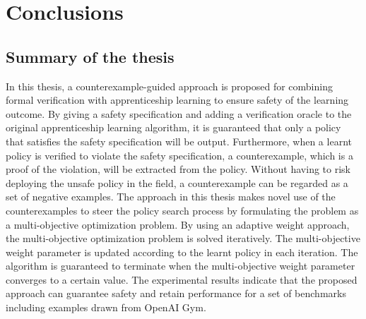 \chapter{Conclusions}
\label{chapter:Conclusions}
\thispagestyle{myheadings}

\graphicspath{{3_Conclusion/Figures/}}

\section{Summary of the thesis}
In this thesis, a counterexample-guided approach is proposed for combining formal verification with apprenticeship learning to ensure safety of the learning outcome. By giving a safety specification and adding a verification oracle to the original apprenticeship learning algorithm, it is guaranteed that only a policy that satisfies the safety specification will be output. Furthermore, when a learnt policy is verified to violate the safety specification, a counterexample, which is a proof of the violation, will be extracted from the policy. Without having to risk deploying the unsafe policy in the field, a counterexample can be regarded as a set of negative examples. The approach in this thesis makes novel use of the counterexamples to steer the policy search process by formulating the problem as a multi-objective optimization problem. By using an adaptive weight approach, the multi-objective optimization problem is solved iteratively. The multi-objective weight parameter is updated according to the learnt policy in each iteration. The algorithm is guaranteed to terminate when the multi-objective weight parameter converges to a certain value. The experimental results indicate that the proposed approach can guarantee safety and retain performance for a set of benchmarks including examples drawn from OpenAI Gym.

